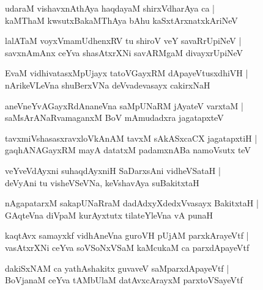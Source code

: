 \documentclass[twoside,12pt,openright]{book}
\newcounter{shloka}[chapter]
\begin{document}
\begin{shloka}%
udaraM vishavxnAthAya haqdayaM shirxVdharAya ca |\\
kaMThaM kwsutxBakaMThAya bAhu kaSxtArxnatxkAriNeV
\end{shloka}

\begin{shloka}%
lalATaM voyxVmamUdhenxRV tu shiroV veY savaRrUpiNeV |\\
savxnAmAnx ceYva shasAtxrXNi savARMgaM divayxrUpiNeV
\end{shloka}

\begin{shloka}%
EvaM vidhivatasxMpUjayx tatoVGayxRM dApayeVtusxdhiVH |\\
nArikeVLeVna shuBerxVNa deVvadevasayx cakirxNaH
\end{shloka}

\begin{shloka}%
aneVneYvAGayxRdAnaneVna saMpUNaRM jAyateV varxtaM |\\
saMsArANaRvamaganxM BoV mAmudadxra jagatapxteV 
\end{shloka}

\begin{shloka}%
tavxmiVshasasxravxloVkAnAM tavxM sAkASxcaCX jagatapxtiH |\\
gaqhANAGayxRM mayA datatxM padamxnABa namoVsutx teV 
\end{shloka}

\begin{shloka}%
veYveVdAyxni suhaqdAyxniH SaDarxsAni vidheVSataH |\\
deVyAni tu visheVSeVNa, keVshavAya suBakitxtaH
\end{shloka}

\begin{shloka}%
nAgapatarxM sakapUNaRraM dadAdxyXdedxVvasayx BakitxtaH |\\
GAqteVna diVpaM kurAyxtutx tilateYleVna vA punaH 
\end{shloka}

\begin{shloka}%
kaqtAvx samayxkf vidhAneVna guroVH pUjAM parxkArayeVtf |\\
vasAtxrXNi ceYva soVSoNxVSaM kaMcukaM ca parxdApayeVtf
\end{shloka}

\begin{shloka}%
dakiSxNAM ca yathAshakitx guvaveV saMparxdApayeVtf |\\
BoVjanaM ceYva tAMbUlaM datAvxcArayxM parxtoVSayeVtf
\end{shloka}
\end{document}
